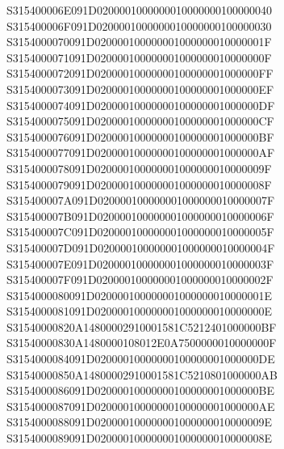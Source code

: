 \documentclass[12pt,a4paper]{article}
\begin{document}
\begin{framed}
{S315400006E091D0200001000000010000000100000040\newline
S315400006F091D0200001000000010000000100000030\newline
S3154000070091D020000100000001000000010000001F\newline
S3154000071091D020000100000001000000010000000F\newline
S3154000072091D02000010000000100000001000000FF\newline
S3154000073091D02000010000000100000001000000EF\newline
S3154000074091D02000010000000100000001000000DF\newline
S3154000075091D02000010000000100000001000000CF\newline
S3154000076091D02000010000000100000001000000BF\newline
S3154000077091D02000010000000100000001000000AF\newline
S3154000078091D020000100000001000000010000009F\newline
S3154000079091D020000100000001000000010000008F\newline
S315400007A091D020000100000001000000010000007F\newline
S315400007B091D020000100000001000000010000006F\newline
S315400007C091D020000100000001000000010000005F\newline
S315400007D091D020000100000001000000010000004F\newline
S315400007E091D020000100000001000000010000003F\newline
S315400007F091D020000100000001000000010000002F\newline
S3154000080091D020000100000001000000010000001E\newline
S3154000081091D020000100000001000000010000000E\newline
S31540000820A14800002910001581C5212401000000BF\newline
S31540000830A1480000108012E0A7500000010000000F\newline
S3154000084091D02000010000000100000001000000DE\newline
S31540000850A14800002910001581C5210801000000AB\newline
S3154000086091D02000010000000100000001000000BE\newline
S3154000087091D02000010000000100000001000000AE\newline
S3154000088091D020000100000001000000010000009E\newline
S3154000089091D020000100000001000000010000008E\newline
}
\end{framed}
\end{document}
